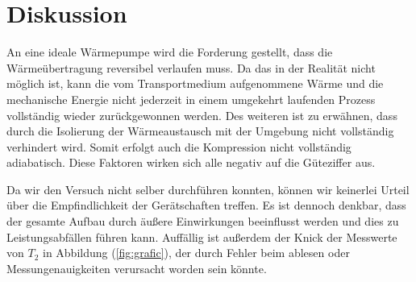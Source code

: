 \section{Diskussion}
\label{sec:Diskussion}
An eine ideale Wärmepumpe wird die Forderung gestellt, dass die Wärmeübertragung reversibel verlaufen muss.
Da das in der Realität nicht möglich ist, kann die vom Transportmedium aufgenommene Wärme 
und die mechanische Energie nicht jederzeit in einem umgekehrt laufenden Prozess vollständig wieder zurückgewonnen werden.
Des weiteren ist zu erwähnen, dass durch die Isolierung der Wärmeaustausch mit der Umgebung nicht vollständig verhindert wird. 
Somit erfolgt auch die Kompression nicht vollständig adiabatisch. 
Diese Faktoren wirken sich alle negativ auf die Güteziffer aus.

Da wir den Versuch nicht selber durchführen konnten, können wir keinerlei Urteil über die Empfindlichkeit der Gerätschaften treffen.
Es ist dennoch denkbar, dass der gesamte Aufbau durch äußere Einwirkungen beeinflusst werden und dies zu Leistungsabfällen führen kann.
Auffällig ist außerdem der Knick der Messwerte von $T_2$ in Abbildung (\ref{fig:grafic}), der durch Fehler beim ablesen oder Messungenauigkeiten verursacht worden sein könnte.
